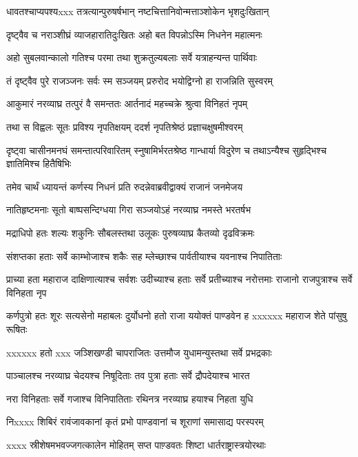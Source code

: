 \twolineshloka
{धावतश्चाप्यपश्यxxx तत्रत्यान्पुरुषर्षभान्}
{नष्टचित्तानिवोन्मत्ताञ्शोकेन भृशदुःखितान्}


\twolineshloka
{दृष्ट्वैव च नराञ्शीघ्रं व्याजहारातिदुःखितः}
{अहो बत विपन्नोऽस्मि निधनेन महात्मनः}


\twolineshloka
{अहो सुबलवान्कालो गतिश्च परमा तथा}
{शुक्रतुल्यबलाः सर्वे यत्राहन्यन्त पार्थिवाः}


\twolineshloka
{तं दृष्ट्वैव पुरे राजञ्जनः सर्वः स्म सञ्जयम्}
{प्ररुरोद भयोद्विग्नो हा राजन्निति सुस्वरम्}


\twolineshloka
{आकुमारं नरव्याघ्र तत्पुरं वै समन्ततः}
{आर्तनादं महच्चक्रे श्रुत्वा विनिहतं नृपम्}


\twolineshloka
{तथा स विह्वलः सूतः प्रविश्य नृपतिक्षयम्}
{ददर्श नृपतिश्रेष्ठं प्रज्ञाचक्षुषमीश्वरम्}


\threelineshloka
{दृष्ट्वा चासीनमनघं समन्तात्परिवारितम्}
{स्नुषामिर्भरतश्रेष्ठ गान्धार्या विदुरेण च}
{तथाऽन्यैश्च सुहृद्भिश्च ज्ञातिमिश्च हितैषिभिः}


\twolineshloka
{तमेव चार्थं ध्यायन्तं कर्णस्य निधनं प्रति}
{रुदन्नेवाब्रवीद्वाक्यं राजानं जनमेजय}


\twolineshloka
{नातिहृष्टमनाः सूतो बाष्पसन्दिग्धया गिरा}
{सञ्जयोऽहं नरव्याघ्र नमस्ते भरतर्षभ}


\twolineshloka
{मद्राधिपो हतः शल्यः शकुनिः सौबलस्तथा}
{उलूकः पुरुषव्याघ्र कैतव्यो दृढविक्रमः}


\twolineshloka
{संशप्तका हताः सर्वे काम्भोजाश्च शकैः सह}
{म्लेच्छाश्च पार्वतीयाश्च यवनाश्च निपातिताः}


\threelineshloka
{प्राच्या हता महाराज दाक्षिणात्याश्च सर्वशः}
{उदीच्याश्च हताः सर्वे प्रतीच्याश्च नरोत्तमाः}
{राजानो राजपुत्राश्च सर्वे विनिहता नृप}


कर्णपुत्रो हतः शूरः सत्यसेनो महाबलः
\twolineshloka
{दुर्योधनो हतो राजा ययोक्तं पाण्डवेन ह}
{xxxxxx महाराज शेते पांसुषु रूषितः}


\twolineshloka
{xxxxxx हतो xxx जञ्शिखण्डी चापराजितः}
{उत्तमौज युधामन्युस्तथा सर्वे प्रभद्रकाः}


\twolineshloka
{पाञ्चालश्च नरव्याघ्र चेदयश्च निषूदिताः}
{तव पुत्रा हताः सर्वे द्रौपदेयाश्च भारत}


\twolineshloka
{नरा विनिहताः सर्वे गजाश्च विनिपातिताः}
{रथिनत्र नरव्याघ्र हयाश्च निहता युधि}


\twolineshloka
{निxxxx शिबिरं रावंजावकानां कृतं प्रभो}
{पाण्डवानां च शूराणां समासाद्य परस्परम्}


\twolineshloka
{xxxx स्रीशेषमभवज्जगत्कालेन मोहितम्}
{सप्त पाण़्डवतः शिष्टा धार्तराष्ट्रास्त्रयोरथाः}


